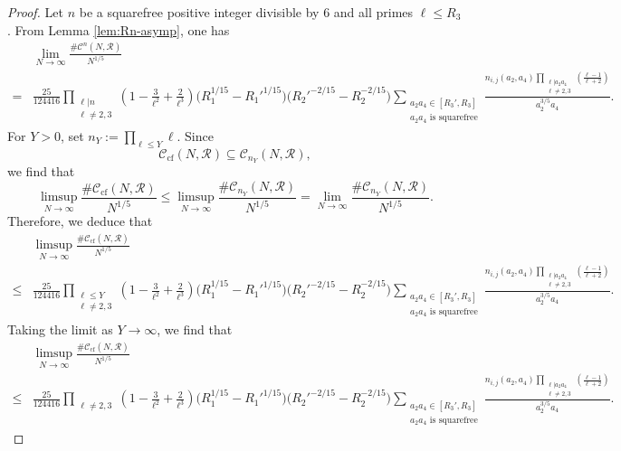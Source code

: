 \documentclass[table]{amsart}
\newcommand{\op}[1]{\operatorname{#1}}
\numberwithin{equation}{section}
\begin{document}
\begin{proof}
Let $n$ be a squarefree positive integer divisible by $6$ and all primes $\ell\leq R_3$. From Lemma \ref{lem:Rn-asymp}, one has
\[
\begin{split}&\lim_{N\rightarrow \infty}\frac{\#\mathcal{C}^n(N,\mathscr{R})}{N^{1/5}}\\
=&
\frac{25}{124416}\prod_{\substack{\ell|n\\\ell\neq 2,3}}\left(1-\frac{3}{\ell^2}+\frac{2}{\ell^3}\right)
\bigl(R_1^{1/15}-R_1'^{1/15}\bigr)
\bigl(R_2'^{-2/15}-R_2^{-2/15}\bigr) \sum_{\substack{a_2a_4\in [R_3', R_3]\\
    a_2a_4\text{ is squarefree}}}\frac{n_{i,j}(a_2,a_4)\prod_{\substack{\ell|a_2a_4\\ \ell\neq 2,3}}\left(\frac{\ell-1}{\ell+2}\right)}{a_2^{3/5} a_4}.
    \end{split}
\]
For $Y>0$, set $n_Y:=\prod_{\ell\leq Y} \ell$. Since
\[\mathcal{C}_{\op{cf}}(N,\mathscr{R})\subseteq \mathcal{C}_{n_Y}(N,\mathscr{R}),\]we find that
\[\limsup_{N\rightarrow \infty} \frac{\# \mathcal{C}_{\op{cf}}(N,\mathscr{R})}{N^{1/5}}\leq \limsup_{N\rightarrow \infty} \frac{\# \mathcal{C}_{n_Y}(N,\mathscr{R})}{N^{1/5}}=\lim_{N\rightarrow \infty} \frac{\# \mathcal{C}_{n_Y}(N,\mathscr{R})}{N^{1/5}}.\]
Therefore, we deduce that
\[\begin{split}&\limsup_{N\rightarrow \infty} \frac{\# \mathcal{C}_{\op{cf}}(N,\mathscr{R})}{N^{1/5}}\\
\leq &\frac{25}{124416}\prod_{\substack{\ell\leq Y\\\ell\neq 2,3}}\left(1-\frac{3}{\ell^2}+\frac{2}{\ell^3}\right)
\bigl(R_1^{1/15}-R_1'^{1/15}\bigr)
\bigl(R_2'^{-2/15}-R_2^{-2/15}\bigr) \sum_{\substack{a_2a_4\in [R_3', R_3]\\
    a_2a_4\text{ is squarefree}}}\frac{n_{i,j}(a_2,a_4)\prod_{\substack{\ell|a_2a_4\\ \ell\neq 2,3}}\left(\frac{\ell-1}{\ell+2}\right)}{a_2^{3/5} a_4}.\end{split}\]
    Taking the limit as $Y\rightarrow \infty$, we find that
    \[\begin{split}&\limsup_{N\rightarrow \infty} \frac{\# \mathcal{C}_{\op{cf}}(N,\mathscr{R})}{N^{1/5}}\\
    \leq& \frac{25}{124416}\prod_{\substack{\ell\neq 2,3}}\left(1-\frac{3}{\ell^2}+\frac{2}{\ell^3}\right)
\bigl(R_1^{1/15}-R_1'^{1/15}\bigr)
\bigl(R_2'^{-2/15}-R_2^{-2/15}\bigr) \sum_{\substack{a_2a_4\in [R_3', R_3]\\
    a_2a_4\text{ is squarefree}}}\frac{n_{i,j}(a_2,a_4)\prod_{\substack{\ell|a_2a_4\\ \ell\neq 2,3}}\left(\frac{\ell-1}{\ell+2}\right)}{a_2^{3/5} a_4}.\end{split}\]

\end{proof}
\end{document}
